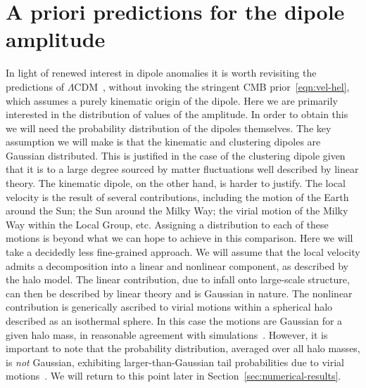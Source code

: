 \documentclass[fleqn,usenatbib]{mnras}
\def\LCDM{$\Lambda$CDM}
\begin{document}
\section{A priori predictions for the dipole amplitude}\label{sec:pdf}
In light of renewed interest in dipole anomalies it is worth
revisiting the predictions of \LCDM~\citep[e.g.][]{2012MNRAS.427.1994G,2014A&A...565A.111R,2016JCAP...03..062T,2019MNRAS.486.1350B},
without invoking the stringent CMB prior~\eqref{eqn:vel-hel},
which assumes a purely kinematic origin of the dipole.
Here we are primarily interested in the distribution of values
of the amplitude. In order to obtain this we will need the
probability distribution of the dipoles themselves.
The key assumption we will make is that the kinematic and
clustering dipoles are Gaussian distributed. This is justified
in the case of the clustering dipole given that it is to
a large degree sourced by matter fluctuations well described by
linear theory. The kinematic dipole, on the other hand, is harder
to justify. The local velocity is the result of several contributions,
including the motion of the Earth around the Sun; the Sun around
the Milky Way; the virial motion of the Milky Way within the
Local Group, etc. Assigning a distribution
to each of these motions is beyond what we can hope to achieve in
this comparison. Here we will take a decidedly less fine-grained approach.
We will assume that the local velocity admits a decomposition
into a linear and nonlinear component, as described by the halo model.
The linear contribution, due to infall onto large-scale structure, can
then be described by linear theory and is Gaussian in nature. The nonlinear
contribution is generically ascribed to virial motions within a spherical halo
described as an isothermal sphere. In this case the motions are Gaussian for
a given halo mass, in reasonable agreement with simulations~\citep{2001MNRAS.322..901S}.
However, it is important to note that the probability distribution,
averaged over all halo masses, is \emph{not} Gaussian, exhibiting 
larger-than-Gaussian tail probabilities due to virial
motions~\citep{Cooray:2002dia}. We will return to this point later in
Section~\ref{sec:numerical-results}.
\end{document}
